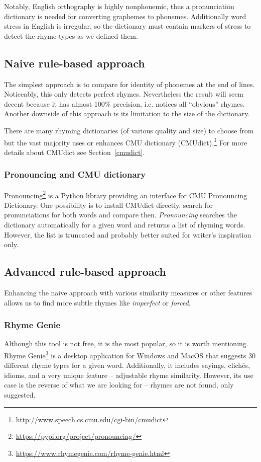 Notably, English orthography is highly nonphonemic, thus a pronunciation dictionary is needed for converting graphemes to phonemes. Additionally word stress in English is irregular, so the dictionary must contain markers of stress to detect the rhyme types as we defined them.

\subsection{Naive rule-based approach} 
The simplest approach is to compare for identity of phonemes at the end of lines. Noticeably,  this only detects perfect rhymes. Nevertheless the result will seem decent because it has almost 100\% precision, i.e. notices all ``obvious'' rhymes. Another downside of this approach is its limitation to the size of the dictionary.

There are many rhyming dictionaries (of various quality and size) to choose from but the vast majority uses or enhances CMU dictionary (CMUdict).\footnote{\url{http://www.speech.cs.cmu.edu/cgi-bin/cmudict}} For more details about CMUdict see Section~\ref{cmudict}.
\subsubsection*{Pronouncing and CMU dictionary}
Pronouncing\footnote{\url{https://pypi.org/project/pronouncing/}} is a Python library providing an interface for CMU Pronouncing Dictionary. One possibility is to install CMUdict directly, search for pronunciations for both words and compare then. \textit{Pronouncing} searches the dictionary automatically for a given word and returns a list of rhyming words. However, the list is truncated and probably better suited for writer's inspiration only.


\subsection{Advanced rule-based approach}
Enhancing the naive approach with various similarity measures or other features allows us to find more subtle rhymes like \textit{imperfect} or \textit{forced}.

\subsubsection*{Rhyme Genie}
Although this tool is not free, it is the most popular, so it is worth mentioning. Rhyme Genie\footnote{\url{https://www.rhymegenie.com/rhyme-genie.html}} is a desktop application for Windows and MacOS that suggests 30 different rhyme types for a given word. Additionally, it includes sayings, clichés, idioms, and a very unique feature -- adjustable rhyme similarity. However, its use case is the reverse of what we are looking for -- rhymes are not found, only suggested.

